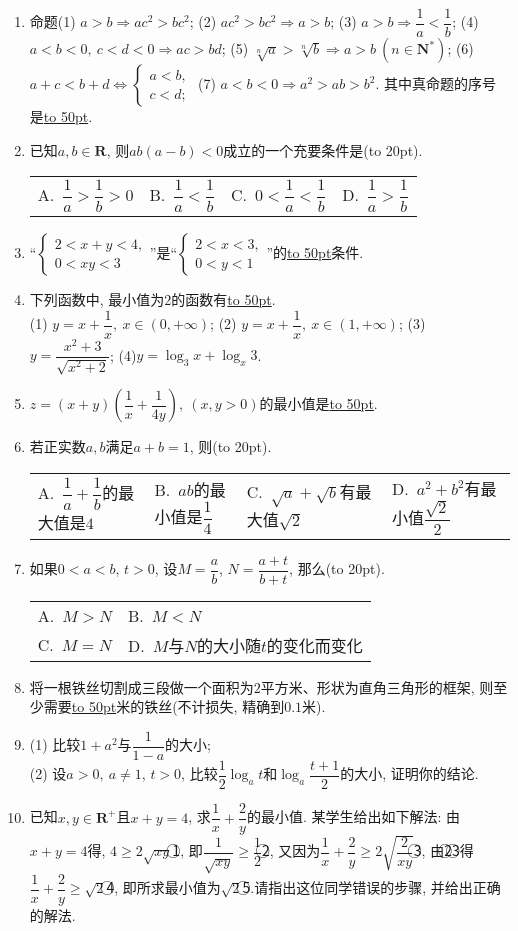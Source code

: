 \documentclass[10pt,a4paper]{article}
\newcommand{\blank}[1]{\underline{\hbox to #1pt{}}}
\newcommand{\bracket}[1]{(\hbox to #1pt{})}
\newcommand{\twoch}[4]{\par\begin{tabular}{p{.46\textwidth}p{.46\textwidth}}
A.~#1& B.~#2\\
C.~#3& D.~#4
\end{tabular}}
\newcommand{\fourch}[4]{\par\begin{tabular}{p{.23\textwidth}p{.23\textwidth}p{.23\textwidth}p{.23\textwidth}}
A.~#1 &B.~#2& C.~#3& D.~#4
\end{tabular}}
\begin{document}
\begin{enumerate}[1.]

\item 命题(1) $a>b\Rightarrow ac^2>bc^2$;   (2) $ac^2>bc^2\Rightarrow a>b$;     (3) $a>b\Rightarrow \dfrac 1a<\dfrac 1b$; (4) $a<b<0, \ c<d<0\Rightarrow ac>bd$;   (5) $\sqrt[n]a>\sqrt[n]b\Rightarrow a>b \ (n\in \mathbf{N}^*)$;    (6) $a+c<b+d\Leftrightarrow \begin{cases} a<b, \\ c<d; \end{cases}$ (7) $a<b<0\Rightarrow a^2>ab>b^2$. 其中真命题的序号是\blank{50}.
\item 已知$a,b\in \mathbf{R}$, 则$ab(a-b)<0$成立的一个充要条件是\bracket{20}.
\fourch{$\dfrac 1a>\dfrac 1b>0$}{$\dfrac 1a<\dfrac 1b$}{$0<\dfrac 1a<\dfrac 1b$}{$\dfrac 1a>\dfrac 1b$}
\item ``$\begin{cases} 2<x+y<4, \\ 0<xy<3 \end{cases}$''是``$\begin{cases} 2<x<3, \\ 0<y<1 \end{cases}$''的\blank{50}条件.
\item 下列函数中, 最小值为$2$的函数有\blank{50}.\\
(1) $y=x+\dfrac 1x, \ x\in (0,+\infty)$; (2) $y=x+\dfrac 1x,\ x\in (1,+\infty)$;    (3) $y=\dfrac{x^2+3}{\sqrt{x^2+2}}$;    (4)$y=\log_3x+\log_x3$.
\item $z=(x+y)(\dfrac 1x+\dfrac 1{4y}), \ (x,y>0)$的最小值是\blank{50}.
\item 若正实数$a,b$满足$a+b=1$, 则\bracket{20}.
\fourch{$\dfrac 1a+\dfrac 1b$的最大值是$4$}{$ab$的最小值是$\dfrac 14$}{$\sqrt a+\sqrt b$有最大值$\sqrt 2$}{$a^2+b^2$有最小值$\dfrac{\sqrt 2}2$}
\item 如果$0<a<b$, $t>0$, 设$M=\dfrac ab$, $N=\dfrac{a+t}{b+t}$, 那么\bracket{20}.
\twoch{$M>N$}{$M<N$}{$M=N$}{$M$与$N$的大小随$t$的变化而变化}
\item 将一根铁丝切割成三段做一个面积为$2$平方米、形状为直角三角形的框架, 则至少需要\blank{50}米的铁丝(不计损失, 精确到$0.1$米).
\item (1) 比较$1+a^2$与$\dfrac 1{1-a}$的大小;\\
(2) 设$a>0,\ a\ne 1$, $t>0$, 比较$\dfrac 12\log_at$和$\log_a\dfrac{t+1}2$的大小, 证明你的结论.
\item 已知$x,y\in \mathbf{R}^+$且$x+y=4$, 求$\dfrac 1x+\dfrac 2y$的最小值. 某学生给出如下解法: 由$x+y=4$得, $4\ge 2\sqrt{xy}$\textcircled{1}, 即$\dfrac 1{\sqrt{xy}}\ge \dfrac 12$\textcircled{2}, 又因为$\dfrac 1x+\dfrac 2y\ge 2\sqrt{\dfrac 2{xy}}$\textcircled{3}, 由\textcircled{2}\textcircled{3}得$\dfrac 1x+\dfrac 2y\ge \sqrt 2$\textcircled{4}, 即所求最小值为$\sqrt 2$\textcircled{5}.请指出这位同学错误的步骤, 并给出正确的解法.

\end{enumerate}
\end{document}
